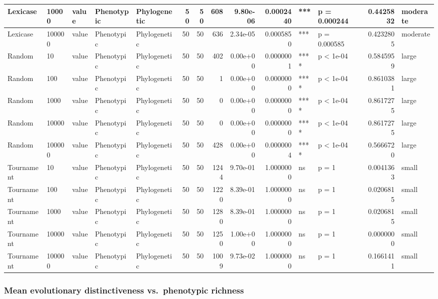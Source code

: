 \documentclass[]{book}
\begin{document}
\begin{table}
\begin{tabular}[t]{l|l|l|l|l|r|r|r|r|r|l|l|r|l}
\hline
Lexicase & 10000 & value & Phenotypic & Phylogenetic & 50 & 50 & 608 & 9.80e-06 & 0.0002440 & *** & p = 0.000244 & 0.4425832 & moderate\\
\hline
Lexicase & 100000 & value & Phenotypic & Phylogenetic & 50 & 50 & 636 & 2.34e-05 & 0.0005850 & *** & p = 0.000585 & 0.4232805 & moderate\\
\hline
Random & 10 & value & Phenotypic & Phylogenetic & 50 & 50 & 402 & 0.00e+00 & 0.0000001 & **** & p < 1e-04 & 0.5845959 & large\\
\hline
Random & 100 & value & Phenotypic & Phylogenetic & 50 & 50 & 1 & 0.00e+00 & 0.0000000 & **** & p < 1e-04 & 0.8610381 & large\\
\hline
Random & 1000 & value & Phenotypic & Phylogenetic & 50 & 50 & 0 & 0.00e+00 & 0.0000000 & **** & p < 1e-04 & 0.8617275 & large\\
\hline
Random & 10000 & value & Phenotypic & Phylogenetic & 50 & 50 & 0 & 0.00e+00 & 0.0000000 & **** & p < 1e-04 & 0.8617275 & large\\
\hline
Random & 100000 & value & Phenotypic & Phylogenetic & 50 & 50 & 428 & 0.00e+00 & 0.0000004 & **** & p < 1e-04 & 0.5666720 & large\\
\hline
Tournament & 10 & value & Phenotypic & Phylogenetic & 50 & 50 & 1244 & 9.70e-01 & 1.0000000 & ns & p = 1 & 0.0041363 & small\\
\hline
Tournament & 100 & value & Phenotypic & Phylogenetic & 50 & 50 & 1220 & 8.39e-01 & 1.0000000 & ns & p = 1 & 0.0206815 & small\\
\hline
Tournament & 1000 & value & Phenotypic & Phylogenetic & 50 & 50 & 1280 & 8.39e-01 & 1.0000000 & ns & p = 1 & 0.0206815 & small\\
\hline
Tournament & 10000 & value & Phenotypic & Phylogenetic & 50 & 50 & 1250 & 1.00e+00 & 1.0000000 & ns & p = 1 & 0.0000000 & small\\
\hline
Tournament & 100000 & value & Phenotypic & Phylogenetic & 50 & 50 & 1009 & 9.73e-02 & 1.0000000 & ns & p = 1 & 0.1661411 & small\\
\hline
\end{tabular}
\end{table}

\hypertarget{mean-evolutionary-distinctiveness-vs.phenotypic-richness}{%
\subsubsection{Mean evolutionary distinctiveness vs.~phenotypic richness}\label{mean-evolutionary-distinctiveness-vs.phenotypic-richness}}
\end{document}

